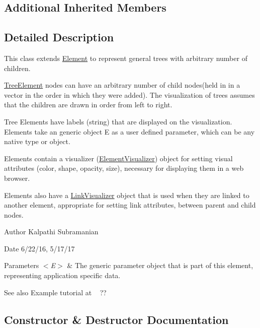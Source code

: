 \subsection*{Additional Inherited Members}


\subsection{Detailed Description}
This class extends \hyperlink{classbridges_1_1base_1_1_element}{Element} to represent general trees with arbitrary number of children. 

\hyperlink{classbridges_1_1base_1_1_tree_element}{Tree\+Element} nodes can have an arbitrary number of child nodes(held in in a vector in the order in which they were added). The visualization of trees assumes that the children are drawn in order from left to right.

Tree Elements have labels (string) that are displayed on the visualization. Elements take an generic object E as a user defined parameter, which can be any native type or object.

Elements contain a visualizer (\hyperlink{classbridges_1_1base_1_1_element_visualizer}{Element\+Visualizer}) object for setting visual attributes (color, shape, opacity, size), necessary for displaying them in a web browser.

Elements also have a \hyperlink{classbridges_1_1base_1_1_link_visualizer}{Link\+Visualizer} object that is used when they are linked to another element, appropriate for setting link attributes, between parent and child nodes.

\begin{DoxyAuthor}{Author}
Kalpathi Subramanian
\end{DoxyAuthor}
\begin{DoxyDate}{Date}
6/22/16, 5/17/17
\end{DoxyDate}

\begin{DoxyParams}{Parameters}
{\em $<$\+E$>$} & The generic parameter object that is part of this element, representing application specific data.\\
\hline
\end{DoxyParams}
\begin{DoxySeeAlso}{See also}
Example tutorial at ~\newline
 ?? 
\end{DoxySeeAlso}


\subsection{Constructor \& Destructor Documentation}
\hypertarget{classbridges_1_1base_1_1_tree_element_ab1af682e9304f5427e308ba5f43d7a9a}{}
